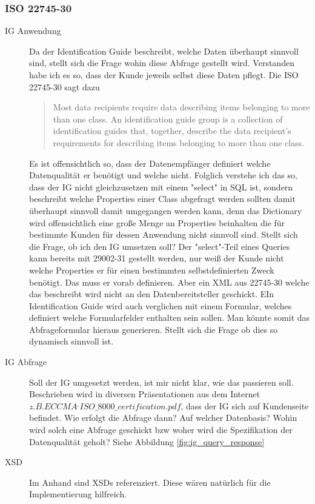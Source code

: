 \subsubsection{ISO 22745-30}
\begin{description}
\item[IG Anwendung] Da der Identification Guide beschreibt, welche Daten überhaupt sinnvoll sind, stellt sich die Frage wohin diese Abfrage gestellt wird. Verstanden habe ich es so, dass der Kunde jeweils selbst diese Daten pflegt. Die ISO 22745-30 sagt dazu \begin{quote}
Most data recipients require data describing items belonging to more than one class. An identification guide group is a collection of identification guides that, together, describe the data recipient's requirements for describing items belonging to more than one class.
\end{quote} Es ist offensichtlich so, dass der Datenempfänger definiert welche Datenqualität er benötigt und welche nicht. 
Folglich verstehe ich das so, dass der IG nicht gleichzusetzen mit einem "select" in SQL ist, sondern beschreibt welche Properties einer Class abgefragt werden sollten damit überhaupt sinnvoll damit umgegangen werden kann, denn das Dictionary wird offensichtlich eine große Menge an Properties beinhalten die für bestimmte Kunden für dessen Anwendung nicht sinnvoll sind. Stellt sich die Frage, ob ich den IG umsetzen soll? Der "select"-Teil eines Queries kann bereits mit 29002-31 gestellt werden, nur weiß der Kunde nicht welche Properties er für einen bestimmten selbstdefinierten Zweck benötigt. Das muss er vorab definieren. Aber ein XML aus 22745-30 welche das beschreibt wird nicht an den Datenbereitsteller geschickt. 
EIn Identification Guide wird auch verglichen mit einem Formular, welches definiert welche Formularfelder enthalten sein sollen. Man könnte somit das Abfrageformular hieraus generieren. Stellt sich die Frage ob dies so dynamisch sinnvoll ist. 
\item[IG Abfrage] Soll der IG umgesetzt werden, ist mir nicht klar, wie das passieren soll. Beschrieben wird in diversen Präsentationen aus dem Internet \(z.B. ECCMA^\_ISO\_8000\_certification.pdf\), dass der IG sich auf Kundenseite befindet. 
Wie erfolgt die Abfrage dann? Auf welcher Datenbasis? Wohin wird solch eine Abfrage geschickt bzw woher wird die Spezifikation der Datenqualität geholt? Siehe Abbildung \ref{fig:ig_query_response}

\item[XSD] Im Anhand sind XSDs referenziert. Diese wären natürlich für die Implementierung hilfreich.
\end{description}


